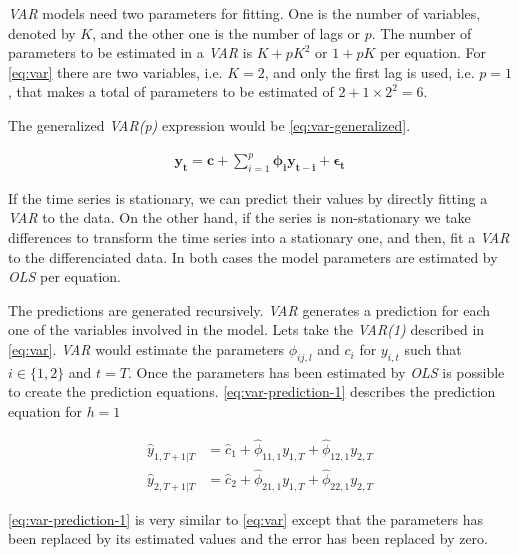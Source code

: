 \textit{VAR} models need two parameters for fitting. One is the number
of variables, denoted by $K$, and the other one is the number of lags
or $p$. The number of parameters to be estimated in a \textit{VAR} is
$K + p K^2$ or $1 + p K$ per equation. For \autoref{eq:var} there are
two variables, i.e. $K=2$, and only the first lag is used, i.e. $p=1$,
that makes a total of parameters to be estimated of
$2 + 1 \times 2^2 = 6$.

The generalized \textit{VAR(p)} expression would be
\autoref{eq:var-generalized}.

\begin{equation}
  \begin{aligned}
    \label{eq:var-generalized}
    \mathbf{y_t} = \mathbf{c} + \displaystyle\sum_{i=1}^p
    \pmb{\phi_i} \mathbf{y_{t-i}} + \pmb{\epsilon_t}
  \end{aligned}
\end{equation}

If the time series is stationary, we can predict their values by
directly fitting a \textit{VAR} to the data. On the other hand, if the
series is non-stationary we take differences to transform the time
series into a stationary one, and then, fit a \textit{VAR} to the
differenciated data. In both cases the model parameters are estimated
by \textit{OLS} per equation.

The predictions are generated recursively. \textit{VAR} generates a
prediction for each one of the variables involved in the model. Lets
take the \textit{VAR(1)} described in \autoref{eq:var}. \textit{VAR}
would estimate the parameters $\phi_{ij,l}$ and $c_i$ for $y_{i,t}$
such that $i \in \{1,2\}$ and $t = T$. Once the parameters has been
estimated by \textit{OLS} is possible to create the prediction
equations. \autoref{eq:var-prediction-1} describes the prediction
equation for $h=1$

\begin{equation}
  \begin{aligned}
    \label{eq:var-prediction-1}
    \hat{y}_{1,T+1|T} & = \hat{c}_1 + \hat{\phi}_{11,1} y_{1,T} +
    \hat{\phi}_{12,1} y_{2,T} \\ 
    \hat{y}_{2,T+1|T} & = \hat{c}_2 + \hat{\phi}_{21,1} y_{1,T} +
    \hat{\phi}_{22,1} y_{2,T}
  \end{aligned}
\end{equation}

\autoref{eq:var-prediction-1} is very similar to \autoref{eq:var}
except that the parameters has been replaced by its estimated values
and the error has been replaced by zero.

